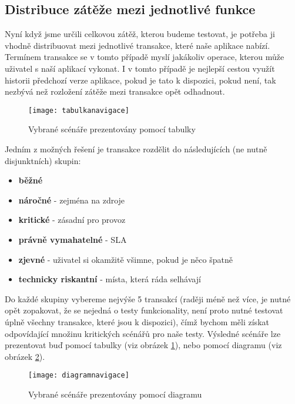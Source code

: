 \documentclass[122pt,oneside]{fithesis}
\begin{document}
\subsection{Distribuce zátěže mezi jednotlivé funkce}

Nyní když jsme určili celkovou zátěž, kterou budeme testovat, je potřeba ji vhodně distribuovat mezi jednotlivé transakce, které naše aplikace nabízí. Termínem transakce se v tomto případě myslí jakákoliv operace, kterou může uživatel s naší aplikací vykonat. I v tomto případě je nejlepší cestou využít historii předchozí verze aplikace, pokud je tato k dispozici, pokud není, tak nezbývá než rozložení zátěže mezi transakce opět odhadnout. 

\begin{figure}[!ht]
\centering
\texttt{[image: tabulkanavigace]}
\caption{Vybrané scénáře prezentovány pomocí tabulky~\cite{molyneaux09}}
\label{img:tabulkaNavigace}
\end{figure}

Jedním z možných řešení je transakce rozdělit do následujících (ne nutně disjunktních) skupin:
\begin{itemize}
  \item {\bf běžné}
  \item {\bf náročné} - zejména na zdroje
  \item {\bf kritické} - zásadní pro provoz
  \item {\bf právně vymahatelné} - SLA
  \item {\bf zjevné} - uživatel si okamžitě všimne, pokud je něco špatně
  \item {\bf technicky riskantní} - místa, která ráda selhávají
\end{itemize}

Do každé skupiny vybereme nejvýše 5 transakcí (raději méně než více, je nutné opět zopakovat, že se nejedná o testy funkcionality, není proto nutné testovat úplně všechny transakce, které jsou k dispozici), čímž bychom měli získat odpovídající množinu kritických scénářů pro naše testy. Výsledné scénáře lze prezentovat buď pomocí tabulky (viz obrázek \ref{img:tabulkaNavigace}), nebo pomocí diagramu (viz obrázek \ref{img:diagramNavigace}).

\begin{figure}[!ht]
\centering
\texttt{[image: diagramnavigace]}
\caption{Vybrané scénáře prezentovány pomocí diagramu}
\label{img:diagramNavigace}
\end{figure}
\end{document}
